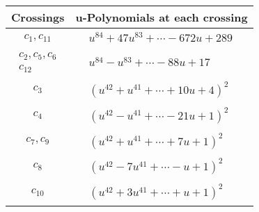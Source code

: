 \documentclass[1p]{elsarticle_modified}
\theoremstyle{definition}
\begin{document}
\begin{tabular}{m{50pt}|m{274pt}}
Crossings & \hspace{64pt}u-Polynomials at each crossing \\
\hline $$\begin{aligned}c_{1},c_{11}\end{aligned}$$&$\begin{aligned}
&u^{84}+47 u^{83}+\cdots-672 u+289
\end{aligned}$\\
\hline $$\begin{aligned}c_{2},c_{5},c_{6}\\c_{12}\end{aligned}$$&$\begin{aligned}
&u^{84}- u^{83}+\cdots-88 u+17
\end{aligned}$\\
\hline $$\begin{aligned}c_{3}\end{aligned}$$&$\begin{aligned}
&(u^{42}+u^{41}+\cdots+10 u+4)^{2}
\end{aligned}$\\
\hline $$\begin{aligned}c_{4}\end{aligned}$$&$\begin{aligned}
&(u^{42}- u^{41}+\cdots-21 u+1)^{2}
\end{aligned}$\\
\hline $$\begin{aligned}c_{7},c_{9}\end{aligned}$$&$\begin{aligned}
&(u^{42}+u^{41}+\cdots+7 u+1)^{2}
\end{aligned}$\\
\hline $$\begin{aligned}c_{8}\end{aligned}$$&$\begin{aligned}
&(u^{42}-7 u^{41}+\cdots- u+1)^{2}
\end{aligned}$\\
\hline $$\begin{aligned}c_{10}\end{aligned}$$&$\begin{aligned}
&(u^{42}+3 u^{41}+\cdots+u+1)^{2}
\end{aligned}$\\
\hline
\end{tabular}\\~\\
\end{document}
